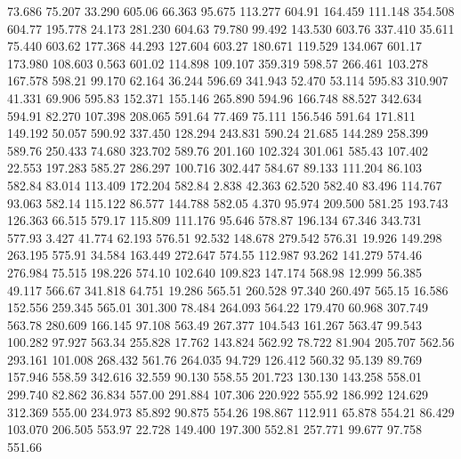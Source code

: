   73.686   75.207   33.290       605.06
  66.363   95.675  113.277       604.91
 164.459  111.148  354.508       604.77
 195.778   24.173  281.230       604.63
  79.780   99.492  143.530       603.76
 337.410   35.611   75.440       603.62
 177.368   44.293  127.604       603.27
 180.671  119.529  134.067       601.17
 173.980  108.603    0.563       601.02
 114.898  109.107  359.319       598.57
 266.461  103.278  167.578       598.21
  99.170   62.164   36.244       596.69
 341.943   52.470   53.114       595.83
 310.907   41.331   69.906       595.83
 152.371  155.146  265.890       594.96
 166.748   88.527  342.634       594.91
  82.270  107.398  208.065       591.64
  77.469   75.111  156.546       591.64
 171.811  149.192   50.057       590.92
 337.450  128.294  243.831       590.24
  21.685  144.289  258.399       589.76
 250.433   74.680  323.702       589.76
 201.160  102.324  301.061       585.43
 107.402   22.553  197.283       585.27
 286.297  100.716  302.447       584.67
  89.133  111.204   86.103       582.84
  83.014  113.409  172.204       582.84
   2.838   42.363   62.520       582.40
  83.496  114.767   93.063       582.14
 115.122   86.577  144.788       582.05
   4.370   95.974  209.500       581.25
 193.743  126.363   66.515       579.17
 115.809  111.176   95.646       578.87
 196.134   67.346  343.731       577.93
   3.427   41.774   62.193       576.51
  92.532  148.678  279.542       576.31
  19.926  149.298  263.195       575.91
  34.584  163.449  272.647       574.55
 112.987   93.262  141.279       574.46
 276.984   75.515  198.226       574.10
 102.640  109.823  147.174       568.98
  12.999   56.385   49.117       566.67
 341.818   64.751   19.286       565.51
 260.528   97.340  260.497       565.15
  16.586  152.556  259.345       565.01
 301.300   78.484  264.093       564.22
 179.470   60.968  307.749       563.78
 280.609  166.145   97.108       563.49
 267.377  104.543  161.267       563.47
  99.543  100.282   97.927       563.34
 255.828   17.762  143.824       562.92
  78.722   81.904  205.707       562.56
 293.161  101.008  268.432       561.76
 264.035   94.729  126.412       560.32
  95.139   89.769  157.946       558.59
 342.616   32.559   90.130       558.55
 201.723  130.130  143.258       558.01
 299.740   82.862   36.834       557.00
 291.884  107.306  220.922       555.92
 186.992  124.629  312.369       555.00
 234.973   85.892   90.875       554.26
 198.867  112.911   65.878       554.21
  86.429  103.070  206.505       553.97
  22.728  149.400  197.300       552.81
 257.771   99.677   97.758       551.66
